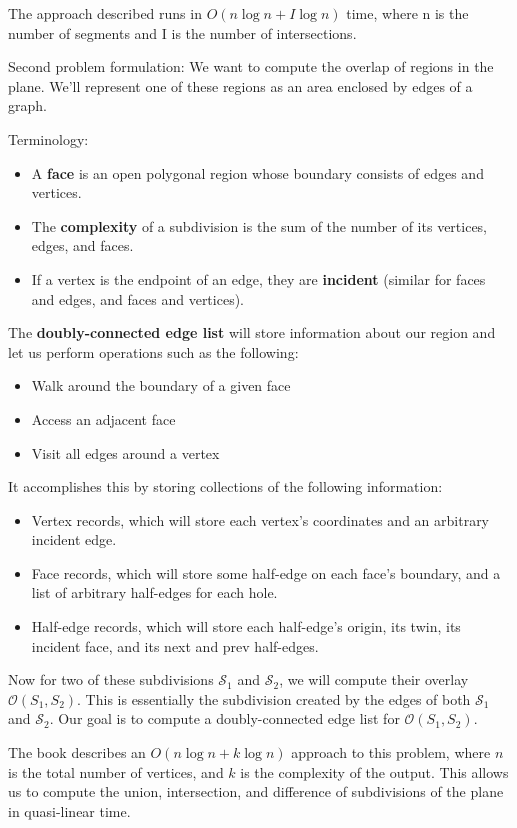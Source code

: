 \documentclass[11pt]{article}
\begin{document}
The approach described runs in $O(n\log n + I\log n)$ time, where n is the number of segments and I is the number of intersections.

Second problem formulation: We want to compute the overlap of regions in the plane. We'll represent one of these regions as an area enclosed by edges of a graph.

Terminology:
\begin{itemize}
    \item A \textbf{face} is an open polygonal region whose boundary consists of edges and vertices.
    \item The \textbf{complexity} of a subdivision is the sum of the number of its vertices, edges, and faces.
    \item If a vertex is the endpoint of an edge, they are \textbf{incident} (similar for faces and edges, and faces and vertices).
\end{itemize}
The \textbf{doubly-connected edge list} will store information about our region and let us perform operations such as the following:
\begin{itemize}
    \item Walk around the boundary of a given face
    \item Access an adjacent face
    \item Visit all edges around a vertex
\end{itemize}

It accomplishes this by storing collections of the following information:
\begin{itemize}
    \item Vertex records, which will store each vertex's coordinates and an arbitrary incident edge.
    \item Face records, which will store some half-edge on each face's boundary, and a list of arbitrary half-edges for each hole.
    \item Half-edge records, which will store each half-edge's origin, its twin, its incident face, and its next and prev half-edges.
\end{itemize}

Now for two of these subdivisions $\mathcal{S}_1$ and $\mathcal{S}_2$, we will compute their overlay $\mathcal{O}(S_1, S_2)$. This is essentially the subdivision created by the edges of both $\mathcal{S}_1$ and $\mathcal{S}_2$. Our goal is to compute a doubly-connected edge list for $\mathcal{O}(S_1, S_2)$.

The book describes an $O(n\log n + k\log n)$ approach to this problem, where $n$ is the total number of vertices, and $k$ is the complexity of the output. This allows us to compute the union, intersection, and difference of subdivisions of the plane in quasi-linear time.
\end{document}
